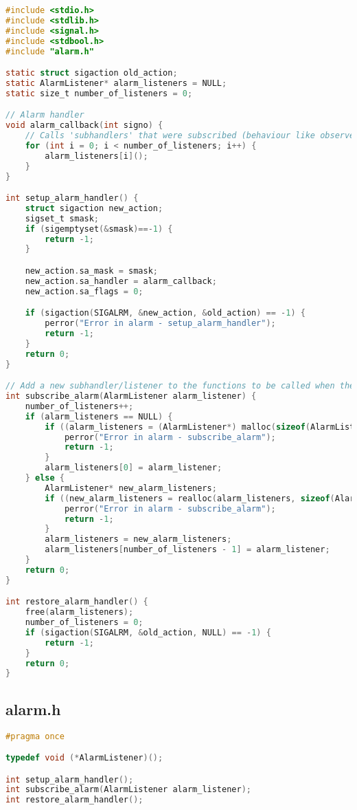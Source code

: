 \begin{lstlisting}[language=C, caption=alarm.c]
#include <stdio.h>
#include <stdlib.h>
#include <signal.h>
#include <stdbool.h>
#include "alarm.h"

static struct sigaction old_action;
static AlarmListener* alarm_listeners = NULL; 
static size_t number_of_listeners = 0;

// Alarm handler
void alarm_callback(int signo) {
    // Calls 'subhandlers' that were subscribed (behaviour like observer pattern in OP)
    for (int i = 0; i < number_of_listeners; i++) {
        alarm_listeners[i]();
    }
}

int setup_alarm_handler() {
    struct sigaction new_action;
    sigset_t smask;
    if (sigemptyset(&smask)==-1) {
        return -1;
    }

    new_action.sa_mask = smask;
    new_action.sa_handler = alarm_callback;
    new_action.sa_flags = 0;

    if (sigaction(SIGALRM, &new_action, &old_action) == -1) {
        perror("Error in alarm - setup_alarm_handler");
        return -1;
    }
    return 0;
}

// Add a new subhandler/listener to the functions to be called when the alarm 'rings'
int subscribe_alarm(AlarmListener alarm_listener) {
    number_of_listeners++;
    if (alarm_listeners == NULL) {
        if ((alarm_listeners = (AlarmListener*) malloc(sizeof(AlarmListener))) == NULL) {
            perror("Error in alarm - subscribe_alarm");
            return -1;
        }
        alarm_listeners[0] = alarm_listener;
    } else {
        AlarmListener* new_alarm_listeners;
        if ((new_alarm_listeners = realloc(alarm_listeners, sizeof(AlarmListener) * number_of_listeners)) == NULL) {
            perror("Error in alarm - subscribe_alarm");
            return -1;
        }
        alarm_listeners = new_alarm_listeners;
        alarm_listeners[number_of_listeners - 1] = alarm_listener;
    }
    return 0;
}

int restore_alarm_handler() {
    free(alarm_listeners);
    number_of_listeners = 0;
    if (sigaction(SIGALRM, &old_action, NULL) == -1) {
        return -1;
    }
    return 0;
}

\end{lstlisting}

\subsection{alarm.h}

\begin{lstlisting}[language=C, caption=alarm.h]
#pragma once

typedef void (*AlarmListener)(); 

int setup_alarm_handler();
int subscribe_alarm(AlarmListener alarm_listener);
int restore_alarm_handler();

\end{lstlisting}

